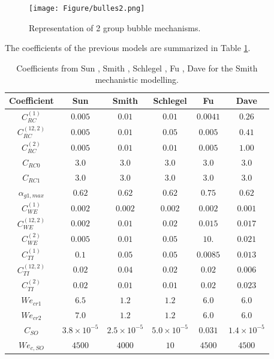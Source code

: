 \begin{figure}[!ht]
    \centering
    \texttt{[image: Figure/bulles2.png]}
    \caption{Representation of 2 group bubble mechanisms.}
    \label{bulles}
\end{figure}
The coefficients of the previous models are summarized in Table \ref{coeff2grp}.
\begin{table}[!ht]
\begin{center}
\begin{tabular}{c c c c c c } 
\toprule
Coefficient & Sun \cite{SUN2} & Smith \cite{Smith1} & Schlegel \cite{Schlegel1} & Fu \cite{Fu2002} & Dave \cite{Dave2016a}\\ 
\midrule
\rowcolor[gray]{0.9} $C^{(1)}_{RC}$ & $0.005$ &$0.01$ & $0.01$ & $0.0041$ & $0.26$ \\  
 $C^{(12,2)}_{RC}$ & $0.005$ & $0.01$ & $0.05$ & $0.005$ & $0.41$ \\ 
 \rowcolor[gray]{0.9} $C^{(2)}_{RC}$ & $0.005$ & $0.01$ & $0.01$ & $0.005$ & $1.00$ \\  
 $C_{RC0}$ & $3.0$ & $3.0$ & $3.0$ & $3.0$ & $3.0$ \\ 
 \rowcolor[gray]{0.9} $C_{RC1}$ & $3.0$ & $3.0$ & $3.0$  & $3.0$ & $3.0$ \\  
 $\alpha_{g1,max}$ & $0.62$ & $0.62$ & $0.62$& $0.75$ & $0.62$ \\ 
\rowcolor[gray]{0.9} $C^{(1)}_{WE}$ & $0.002$ & $0.002$ & $0.002$ & $0.002$ & $0.001$  \\  
$C^{(12,2)}_{WE}$ & $0.002$ & $0.01$ & $0.02$ & $0.015$ & $0.017$\\  
\rowcolor[gray]{0.9} $C^{(2)}_{WE}$ & $0.005$ & $0.01$ & $0.05$ & $10.$ & $0.021$  \\  
$C^{(1)}_{TI}$ & $0.1$ & $0.05$ & $0.05$ & $0.0085$ & $0.013$  \\  
\rowcolor[gray]{0.9} $C^{(12,2)}_{TI}$ & $0.02$ & $0.04$ & $0.02$ & $0.02$ & $0.006$  \\  
$C^{(2)}_{TI}$ & $0.02$ & $0.01$ & $0.01$ & $0.02$ & $0.023$ \\  
\rowcolor[gray]{0.9} $We_{cr1}$ & $6.5$ & $1.2$ & $1.2$ & $6.0$ & $6.0$  \\  
$We_{cr2}$ & $7.0$ & $1.2$ & $ 1.2$ & $6.0$ & $6.0$  \\  
\rowcolor[gray]{0.9} $C_{SO}$ & $3.8 \times 10^{-5}$ & $2.5 \times 10^{-5}$ & $5.0 \times 10^{-5}$ & $0.031$ & $1.4 \times 10^{-5}$ \\  
$We_{c,SO}$ & $4500$ & $4000$ & $10$ & $4500$ & $4500$  \\  \bottomrule
\end{tabular}
\end{center}
\caption{Coefficients from Sun \cite{SUN2}, Smith \cite{Smith1}, Schlegel \cite{Schlegel1}, Fu \cite{Fu2002}, Dave \cite{Dave2016a} for the Smith mechanistic modelling.}
\label{coeff2grp}
\end{table}
